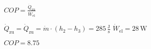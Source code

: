\( COP = \frac{\dot{Q}_{\text{zu}}}{\dot{W}_{\text{el}}} \)  

\( \dot{Q}_{\text{zu}} = \dot{Q}_{\text{zu}} = \dot{m} \cdot (h_2 - h_3) = 285 \, \frac{\text{J}}{\text{s}} \)  
\( \dot{W}_{\text{el}} = 28 \, \text{W} \)  

\( COP = 8.75 \)